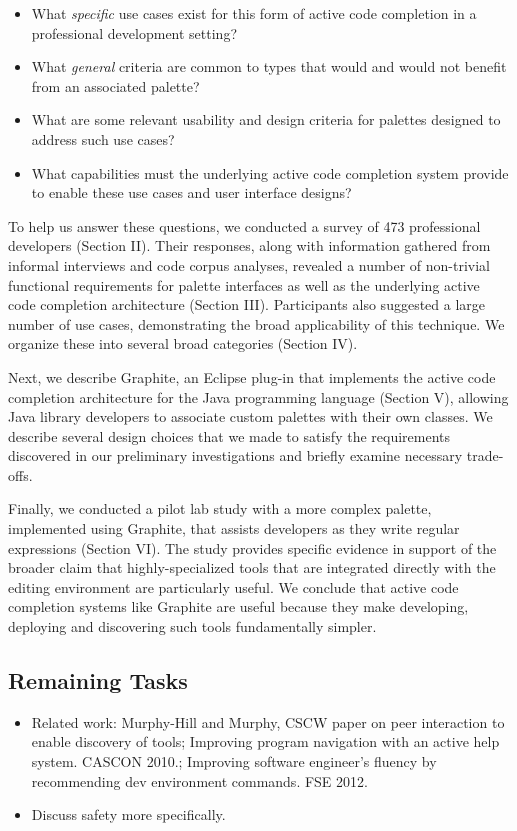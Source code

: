 \begin{itemize}
\item What {\it specific} use cases exist for this form of active code completion in a professional development setting? 
\item What {\it general} criteria are common to types that would and would not benefit from an associated palette?
\item What are some relevant usability and design criteria for palettes designed to address such use cases?
\item What capabilities must the underlying active code completion system provide to enable these use cases and user interface designs?
\end{itemize}

To help us answer these questions, we conducted a survey of 473 professional developers (Section II). Their responses, along with information gathered from informal interviews and code corpus analyses, revealed a number of non-trivial functional requirements for palette interfaces as well as the underlying active code completion architecture (Section III). Participants also suggested a large number of use cases, demonstrating the broad applicability of this technique. We organize these into several broad categories (Section IV). 

Next, we describe Graphite, an Eclipse plug-in that implements the active code completion architecture for the Java programming language (Section V), allowing Java library developers to associate custom palettes with their own classes. We describe several design choices that we made to satisfy the requirements discovered in our preliminary investigations and briefly examine necessary trade-offs.

Finally, we conducted a pilot lab study with a more complex palette, implemented using Graphite, that assists developers as they write regular expressions (Section VI). The study provides specific evidence in support of the broader claim that highly-specialized tools that are integrated directly with the editing environment are particularly useful. We conclude that active code completion systems like Graphite are useful because they make developing, deploying and discovering such tools fundamentally simpler.

\subsection{Remaining Tasks}
\begin{itemize}
\item Related work: Murphy-Hill and Murphy, CSCW paper on peer interaction to enable discovery of tools; 
Improving program navigation with an active help system. CASCON 2010.; 
Improving software engineer's fluency by recommending dev environment commands. FSE 2012.
\item Discuss safety more specifically.
\end{itemize}

